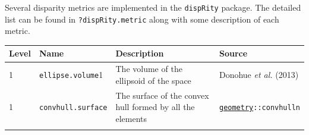 \documentclass[]{book}
\theoremstyle{definition}
\theoremstyle{definition}
\theoremstyle{remark}
\begin{document}
Several disparity metrics are implemented in the \texttt{dispRity}
package. The detailed list can be found in \texttt{?dispRity.metric}
along with some description of each metric.

\begin{longtable}[]{@{}llll@{}}
\toprule
\begin{minipage}[b]{0.08\columnwidth}\raggedright\strut
Level\strut
\end{minipage} & \begin{minipage}[b]{0.08\columnwidth}\raggedright\strut
Name\strut
\end{minipage} & \begin{minipage}[b]{0.61\columnwidth}\raggedright\strut
Description\strut
\end{minipage} & \begin{minipage}[b]{0.11\columnwidth}\raggedright\strut
Source\strut
\end{minipage}\tabularnewline
\midrule
\endhead
\begin{minipage}[t]{0.08\columnwidth}\raggedright\strut
1\strut
\end{minipage} & \begin{minipage}[t]{0.08\columnwidth}\raggedright\strut
\texttt{ellipse.volume}1\strut
\end{minipage} & \begin{minipage}[t]{0.61\columnwidth}\raggedright\strut
The volume of the ellipsoid of the space\strut
\end{minipage} & \begin{minipage}[t]{0.11\columnwidth}\raggedright\strut
Donohue \emph{et al.} (2013)\strut
\end{minipage}\tabularnewline
\begin{minipage}[t]{0.08\columnwidth}\raggedright\strut
1\strut
\end{minipage} & \begin{minipage}[t]{0.08\columnwidth}\raggedright\strut
\texttt{convhull.surface}\strut
\end{minipage} & \begin{minipage}[t]{0.61\columnwidth}\raggedright\strut
The surface of the convex hull formed by all the elements\strut
\end{minipage} & \begin{minipage}[t]{0.11\columnwidth}\raggedright\strut
\href{https://cran.r-project.org/web/packages/geometry/index.html}{\texttt{geometry}}\texttt{::convhulln}\strut
\end{minipage}\tabularnewline
\begin{minipage}[t]{0.08\columnwidth}\raggedright\strut

\end{minipage}
\end{longtable}
\end{document}
